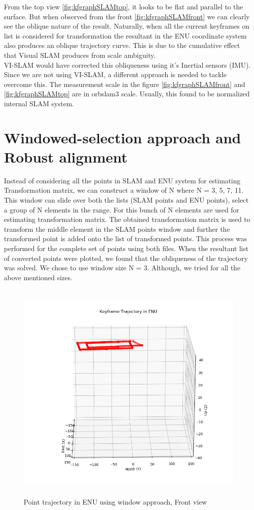 From the top view \ref{fig:kfgraphSLAMtop}, it looks to be flat and parallel to the surface. But when observed from the front \ref{fig:kfgraphSLAMfront} we can clearly see the oblique nature of the result. Naturally, when all the current keyframes on list is considered for transformation the resultant in the ENU coordinate system also produces an oblique trajectory curve. This is due to the cumulative effect that Visual SLAM produces from scale ambiguity.\\ 

VI-SLAM would have corrected this obliqueness using it's Inertial sensors (IMU). Since we are not using VI-SLAM, a different approach is needed to tackle overcome this. The measurement scale in the figure \ref{fig:kfgraphSLAMfront} and \ref{fig:kfgraphSLAMtop} are in orbslam3 scale. Usually, this found to be normalized internal SLAM system.

\section{Windowed-selection approach and Robust alignment}
\label{sec:windowandrobust}
Instead of considering all the points in SLAM and ENU system for estimating Transformation matrix, we can construct a window of N where N = 3, 5, 7, 11. This window can slide over both the lists (SLAM points and ENU points), select a group of N elements in the range. For this bunch of N elements are used for estimating transformation matrix. The obtained transformation matrix is used to transform the middle element in the SLAM points window and further the transformed point is added onto the list of transformed points. This process was performed for the complete set of points using both files. When the resultant list of converted points were plotted, we found that the obliqueness of the trajectory was solved. We chose to use window size N = 3. Although, we tried for all the above mentioned sizes.

\begin{figure}[h]
    \centering
    \includegraphics[height=11cm, width=15cm]{Images/KFTrajectoryENUwindowedFront.png}
    \caption{Point trajectory in ENU using window approach, Front view}
    \label{fig:kfgraphENUfront}
\end{figure}

